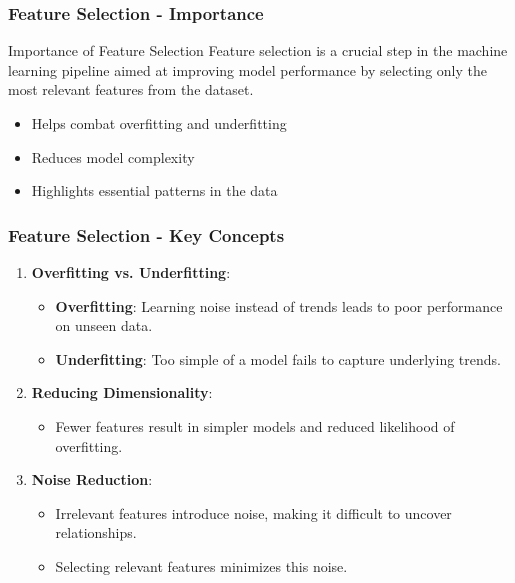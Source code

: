 \documentclass[aspectratio=169]{beamer}
\begin{document}
\begin{frame}[fragile]
    \frametitle{Feature Selection - Importance}
    \begin{block}{Importance of Feature Selection}
        Feature selection is a crucial step in the machine learning pipeline aimed at improving model performance by selecting only the most relevant features from the dataset. 
    \end{block}
    
    \begin{itemize}
        \item Helps combat overfitting and underfitting
        \item Reduces model complexity
        \item Highlights essential patterns in the data
    \end{itemize}
\end{frame}

\begin{frame}[fragile]
    \frametitle{Feature Selection - Key Concepts}
    \begin{enumerate}
        \item \textbf{Overfitting vs. Underfitting}:
            \begin{itemize}
                \item \textbf{Overfitting}: Learning noise instead of trends leads to poor performance on unseen data.
                \item \textbf{Underfitting}: Too simple of a model fails to capture underlying trends.
            \end{itemize}
        
        \item \textbf{Reducing Dimensionality}:
            \begin{itemize}
                \item Fewer features result in simpler models and reduced likelihood of overfitting.
            \end{itemize}

        \item \textbf{Noise Reduction}:
            \begin{itemize}
                \item Irrelevant features introduce noise, making it difficult to uncover relationships.
                \item Selecting relevant features minimizes this noise.
            \end{itemize}
    \end{enumerate}
\end{frame}
\end{document}
